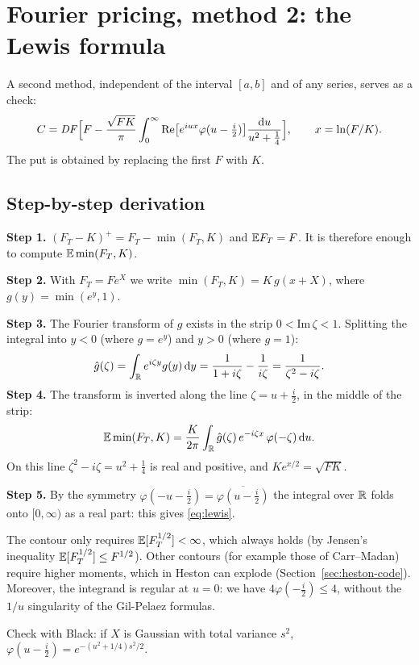 \section{Fourier pricing, method 2: the Lewis formula}
A second method, independent of the interval $[a,b]$ and of any series, serves as a check:
\begin{equation}\label{eq:lewis}
C=\mathit{DF}\Big[F-\frac{\sqrt{FK}}{\pi}\int_0^\infty\mathrm{Re}\big[e^{iux}\varphi(u-\tfrac i2)\big]\frac{\mathrm{d}u}{u^2+\frac14}\Big],
\qquad x=\ln(F/K).
\end{equation}
The put is obtained by replacing the first $F$ with $K$.

\subsection{Step-by-step derivation}
\textbf{Step 1.} $(F_T-K)^+=F_T-\min(F_T,K)$ and $\mathbb{E} F_T=F$. It is therefore enough to compute $\mathbb{E}\min(F_T,K)$.

\textbf{Step 2.} With $F_T=Fe^X$ we write $\min(F_T,K)=K\,g(x+X)$, where $g(y)=\min(e^y,1)$.

\textbf{Step 3.} The Fourier transform of $g$ exists in the strip $0<\mathrm{Im}\,\zeta<1$. Splitting the integral
into $y<0$ (where $g=e^y$) and $y>0$ (where $g=1$):
\[
\hat g(\zeta)=\int_{\mathbb{R}}e^{i\zeta y}g(y)\mathop{}\!\mathrm{d} y=\frac{1}{1+i\zeta}-\frac{1}{i\zeta}=\frac{1}{\zeta^2-i\zeta}.
\]
\textbf{Step 4.} The transform is inverted along the line $\zeta=u+\tfrac i2$, in the middle of the strip:
\[
\mathbb{E}\min(F_T,K)=\frac{K}{2\pi}\int_{\mathbb{R}}\hat g(\zeta)\,e^{-i\zeta x}\,\varphi(-\zeta)\mathop{}\!\mathrm{d} u .
\]
On this line $\zeta^2-i\zeta=u^2+\tfrac14$ is real and positive, and $Ke^{x/2}=\sqrt{FK}$.

\textbf{Step 5.} By the symmetry $\varphi(-u-\tfrac i2)=\overline{\varphi(u-\tfrac i2)}$ the integral over $\mathbb{R}$ folds
onto $[0,\infty)$ as a real part: this gives \eqref{eq:lewis}.

\begin{perche}[title={\texorpdfstring{Why the contour $\mathrm{Im}\,u=-\tfrac12$ in particular}{Why the contour Im u = -1/2 in particular}}]
The contour only requires $\mathbb{E}[F_T^{1/2}]<\infty$, which always holds (by Jensen's inequality
$\mathbb{E}[F_T^{1/2}]\le F^{1/2}$). Other contours (for example those of Carr--Madan) require higher moments, which in Heston
can explode (Section~\ref{sec:heston-code}). Moreover, the integrand is regular at $u=0$: we have
$4\varphi(-\tfrac i2)\le4$, without the $1/u$ singularity of the Gil-Pelaez formulas.

Check with Black: if $X$ is Gaussian with total variance $s^2$, $\varphi(u-\tfrac i2)=e^{-(u^2+1/4)s^2/2}$.
\end{perche}

